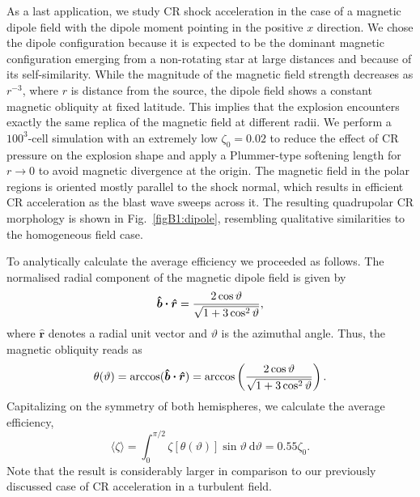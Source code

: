 \documentclass[8pt,a4paper,usenatbib]{mnras}
\newcommand{\bcdot}{\ensuremath{%
  \mathchoice%
   {\mskip\thinmuskip\lower0.2ex\hbox{\scalebox{1.5}{$\cdot$}}\mskip\thinmuskip}}%
   {\mskip\thinmuskip\lower0.2ex\hbox{\scalebox{1.5}{$\cdot$}}\mskip\thinmuskip}%
   {\lower0.3ex\hbox{\scalebox{1.2}{$\cdot$}}}%
   {\lower0.3ex\hbox{\scalebox{1.2}{$\cdot$}}}%
}
\newcommand{\de}{\mathrm{d}}
\begin{document}
As a last application, we study CR shock acceleration in the case of a magnetic
dipole field with the dipole moment pointing in the positive $x$ direction. We
chose the dipole configuration because it is expected to be the dominant
magnetic configuration emerging from a non-rotating star at large distances and
because of its self-similarity.  While the magnitude of the magnetic field
strength decreases as $r^{-3}$, where $r$ is distance from the source, the
dipole field shows a constant magnetic obliquity at fixed latitude.  This
implies that the explosion encounters exactly the same replica of the magnetic
field at different radii. We perform a $100^3$-cell simulation with an extremely
low $\zeta_0 = 0.02$ to reduce the effect of CR pressure on the explosion shape
and apply a Plummer-type softening length for $r \rightarrow 0$ to avoid
magnetic divergence at the origin.  The magnetic field in the polar regions is
oriented mostly parallel to the shock normal, which results in efficient CR
acceleration as the blast wave sweeps across it. The resulting quadrupolar CR
morphology is shown in Fig.~\ref{figB1:dipole}, resembling qualitative
similarities to the homogeneous field case.

To analytically calculate the average efficiency we proceeded as follows. The
normalised radial component of the magnetic dipole field is given by
\begin{equation}
\bm{\hat{b}} \bcdot \bm{\hat{r}} = \dfrac{2 \cos \vartheta}{\sqrt{1 + 3\cos^2\vartheta}} ,
\end{equation}
where $\bm{\hat{r}}$ denotes a radial unit vector and $\vartheta$ is the
azimuthal angle. Thus, the magnetic obliquity reads as
\begin{equation}
\label{eq. B3: thetaphi}
\theta(\vartheta) = \arccos(\bm{\hat{b}} \bcdot \bm{\hat{r}})
=\arccos\left( \dfrac{2 \cos\vartheta}{\sqrt{1 + 3 \cos^2\vartheta}} \right) .
\end{equation}
Capitalizing on the symmetry of both hemispheres, we calculate the average
efficiency, 
\begin{equation}
\langle \zeta \rangle = \int_0^{\pi/2} \zeta[\theta(\vartheta)] \sin \vartheta \ \de \vartheta = 0.55 \zeta_0 .
\end{equation}
Note that the result is considerably larger in comparison to our previously discussed 
case of CR acceleration in a turbulent field.
\end{document}
